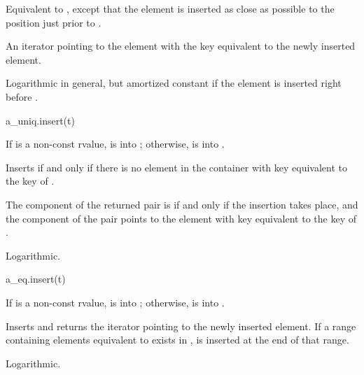 \begin{itemdescr}
\pnum
\result
{}

\pnum
\effects
Equivalent to ,
except that the element is inserted as close as possible to
the position just prior to .

\pnum
\returns
An iterator pointing to the element
with the key equivalent to the newly inserted element.

\pnum
\complexity
Logarithmic in general, but
amortized constant if the element is inserted right before .
\end{itemdescr}

%
\begin{itemdecl}
a_uniq.insert(t)
\end{itemdecl}

\begin{itemdescr}
\pnum
\result
{}

\pnum
\expects
If  is a non-const rvalue,
 is  into ;
otherwise,  is  into .

\pnum
\effects
Inserts  if and only if there is no element in the container
with key equivalent to the key of .

\pnum
\returns
The  component of the returned pair is 
if and only if the insertion takes place, and
the  component of the pair points to
the element with key equivalent to the key of .

\pnum
\complexity
Logarithmic.
\end{itemdescr}

%
\begin{itemdecl}
a_eq.insert(t)
\end{itemdecl}

\begin{itemdescr}
\pnum
\result
{}

\pnum
\expects
If  is a non-const rvalue,
 is  into ;
otherwise,  is  into .

\pnum
\effects
Inserts  and returns the iterator pointing to
the newly inserted element.
If a range containing elements equivalent to  exists in ,
 is inserted at the end of that range.

\pnum
\complexity
Logarithmic.
\end{itemdescr}

